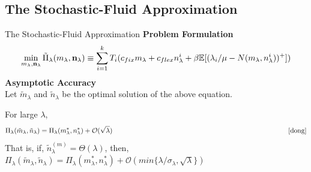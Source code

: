\documentclass[8pt]{beamer}
\begin{document}
\subsection{The Stochastic-Fluid Approximation}
\begin{frame}{The Stochastic-Fluid Approximation}
\textbf{Problem Formulation} \\
\[\min_{m_{\lambda},\bold{n}_{\lambda}} \tilde{\Pi}_{\lambda}(m_{\lambda},\bold{n}_{\lambda}) \equiv \sum_{i=1}^{k} T_i(c_{fix}m_{\lambda} + c_{flex}n_{\lambda}^i + \beta\mathbb{E}[(\lambda_i/\mu - N(m_{\lambda},n_{\lambda}^i))^+])\]
\medskip \textbf{Asymptotic Accuracy} \\
Let $\tilde{m}_{\lambda}$ and $\tilde{n}_{\lambda}$ be the optimal solution of the above equation. 

\begin{theorem}
For large $\lambda$, 
\[ \Pi_{\lambda}(\tilde{m}_{\lambda},\tilde{n}_{\lambda}) = \Pi_{\lambda}(m_{\lambda}^*,n_{\lambda}^*) + \mathcal{O}(\sqrt{\lambda}) \hspace{9cm}  \cite{dong}\] 
That is, if,  $\tilde{n}_{\lambda}^{(m)}=\Theta(\lambda)$, then, $\Pi_{\lambda}(\tilde{m}_{\lambda},\tilde{n}_{\lambda}) = \Pi_{\lambda}(m_{\lambda}^*,n_{\lambda}^*) + \mathcal{O}(min\{\lambda/\sigma_{\lambda}, \sqrt{\lambda}\})$ 
\end{theorem} 
\end{frame}
\end{document}
